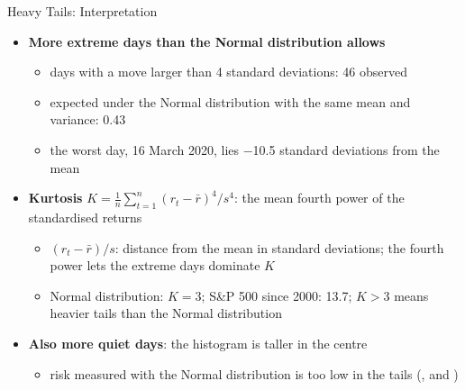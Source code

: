 \begin{frame}{Heavy Tails: Interpretation}
\itemsize{\small}
\begin{itemize}
    \item \textbf{More extreme days than the Normal distribution allows}
    \begin{itemize}
        \item days with a move larger than 4 standard deviations: 46 observed
        \item expected under the Normal distribution with the same mean and variance: 0.43
        \item the worst day, 16 March 2020, lies \ensuremath{-}10.5 standard deviations from the mean
    \end{itemize}
    \item \textbf{Kurtosis} $K = \frac{1}{n}\sum_{t=1}^n (r_t - \bar r)^4 / s^4$: the mean fourth power of the standardised returns
    \begin{itemize}
        \item $(r_t - \bar r)/s$: distance from the mean in standard deviations; the fourth power lets the extreme days dominate $K$
        \item Normal distribution: $K = 3$; S\&P 500 since 2000: 13.7; $K > 3$ means heavier tails than the Normal distribution
    \end{itemize}
    \item \textbf{Also more quiet days}: the histogram is taller in the centre
    \begin{itemize}
        \item risk measured with the Normal distribution is too low in the tails (,  and )
    \end{itemize}
\end{itemize}
\end{frame}

